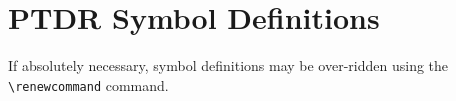 \clearpage
\appendix
\section{PTDR Symbol Definitions\label{app:symdef}}
If absolutely necessary, symbol definitions may
be over-ridden using the \verb|\renewcommand| command.

%
\providecommand{\symexamp}[2]
{\makebox[0.160\textwidth][l]{#1:}
                          \makebox[0.025\textwidth][l]{~}
                          \parbox[t]{0.32\textwidth}{#2\vspace*{-2.5mm}\\}}
\setlength{\columnseprule}{0.2mm}
\setlength{\multicolsep}{7mm}
%
\vspace*{-5mm}
\begin{multicols}{2}
%
\small%
\raggedcolumns%
\noindent%

\\
\end{multicols}
